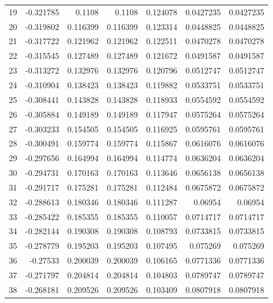 \begin{tabular}{rrrrrrr}
  19 & -0.321785    & 0.1108      & 0.1108      &  0.124078    & 0.0427235   & 0.0427235   \\
  20 & -0.319802    & 0.116399    & 0.116399    &  0.123314    & 0.0448825   & 0.0448825   \\
  21 & -0.317722    & 0.121962    & 0.121962    &  0.122511    & 0.0470278   & 0.0470278   \\
  22 & -0.315545    & 0.127489    & 0.127489    &  0.121672    & 0.0491587   & 0.0491587   \\
  23 & -0.313272    & 0.132976    & 0.132976    &  0.120796    & 0.0512747   & 0.0512747   \\
  24 & -0.310904    & 0.138423    & 0.138423    &  0.119882    & 0.0533751   & 0.0533751   \\
  25 & -0.308441    & 0.143828    & 0.143828    &  0.118933    & 0.0554592   & 0.0554592   \\
  26 & -0.305884    & 0.149189    & 0.149189    &  0.117947    & 0.0575264   & 0.0575264   \\
  27 & -0.303233    & 0.154505    & 0.154505    &  0.116925    & 0.0595761   & 0.0595761   \\
  28 & -0.300491    & 0.159774    & 0.159774    &  0.115867    & 0.0616076   & 0.0616076   \\
  29 & -0.297656    & 0.164994    & 0.164994    &  0.114774    & 0.0636204   & 0.0636204   \\
  30 & -0.294731    & 0.170163    & 0.170163    &  0.113646    & 0.0656138   & 0.0656138   \\
  31 & -0.291717    & 0.175281    & 0.175281    &  0.112484    & 0.0675872   & 0.0675872   \\
  32 & -0.288613    & 0.180346    & 0.180346    &  0.111287    & 0.06954     & 0.06954     \\
  33 & -0.285422    & 0.185355    & 0.185355    &  0.110057    & 0.0714717   & 0.0714717   \\
  34 & -0.282144    & 0.190308    & 0.190308    &  0.108793    & 0.0733815   & 0.0733815   \\
  35 & -0.278779    & 0.195203    & 0.195203    &  0.107495    & 0.075269    & 0.075269    \\
  36 & -0.27533     & 0.200039    & 0.200039    &  0.106165    & 0.0771336   & 0.0771336   \\
  37 & -0.271797    & 0.204814    & 0.204814    &  0.104803    & 0.0789747   & 0.0789747   \\
  38 & -0.268181    & 0.209526    & 0.209526    &  0.103409    & 0.0807918   & 0.0807918   \\

\end{tabular}

